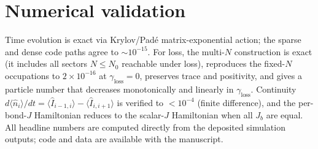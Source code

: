 \documentclass[aps,pra,reprint,amsmath,amssymb,longbibliography,floatfix]{revtex4-2}
\newcommand{\nop}{\hat{n}}
\newcommand{\nexp}{\langle\nop_i\rangle}
\begin{document}
\appendix
\section{Numerical validation}
Time evolution is exact via Krylov/Pad\'e matrix-exponential action; the sparse and dense code
paths agree to $\sim10^{-15}$. For loss, the multi-$N$ construction is exact (it includes all
sectors $N\le N_0$ reachable under loss), reproduces the fixed-$N$ occupations to $2\times10^{-16}$
at $\gamma_{\mathrm{loss}}=0$, preserves trace and positivity, and gives a particle number that
decreases monotonically and linearly in $\gamma_{\mathrm{loss}}$. Continuity
$d\nexp/dt=\langle\hat I_{i-1,i}\rangle-\langle\hat I_{i,i+1}\rangle$ is verified to $<10^{-4}$
(finite difference), and the per-bond-$J$ Hamiltonian reduces to the scalar-$J$ Hamiltonian when
all $J_b$ are equal. All headline numbers are computed directly from the deposited simulation
outputs; code and data are available with the manuscript.


\end{document}

